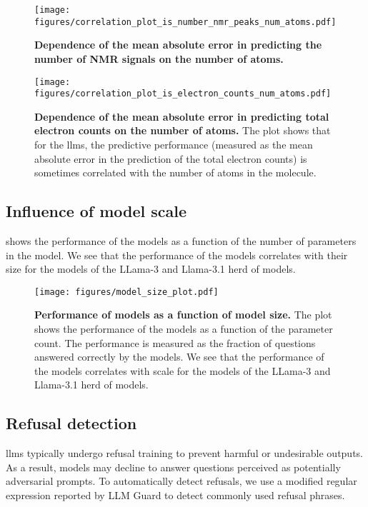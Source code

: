 \begin{figure}[!h]
    \centering
    \texttt{[image: figures/correlation\_plot\_is\_number\_nmr\_peaks\_num\_atoms.pdf]}
    \caption{\textbf{Dependence of the mean absolute error in predicting the number of NMR signals on the number of atoms.} }
    \label{fig:correlation_plot_is_number_nmr_peaks_num_atoms}
\end{figure}


\begin{figure}[!h]
    \centering
    \texttt{[image: figures/correlation\_plot\_is\_electron\_counts\_num\_atoms.pdf]}
    \caption{\textbf{Dependence of the mean absolute error in predicting total electron counts on the number of atoms.} The plot shows that for the \glspl{llm}, the predictive performance (measured as the mean absolute error in the prediction of the total electron counts) is sometimes correlated with the number of atoms in the molecule.}
    \label{fig:correlation_plot_is_electron_counts_num_atoms}
\end{figure}


\clearpage
\subsection{Influence of model scale}
 shows the performance of the models as a function of the number of parameters in the model.
We see that the performance of the models correlates with their size for the models of the LLama-3 and Llama-3.1 herd of models.

\begin{figure}[!h]
    \centering
    \texttt{[image: figures/model\_size\_plot.pdf]}
    \caption{\textbf{Performance of models as a function of model size.} The plot shows the performance of the models as a function of the parameter count. The performance is measured as the fraction of questions answered correctly by the models. We see that the performance of the models correlates with scale for the models of the LLama-3 and Llama-3.1 herd of models.}
    \label{fig:model_size_plot}
\end{figure}


\clearpage
\subsection{Refusal detection}
\Glspl{llm} typically undergo refusal training to prevent harmful or undesirable outputs. As a result, models may decline to answer questions perceived as potentially adversarial prompts.
To automatically detect refusals, we use a modified regular expression reported by LLM Guard\autocite{llmguard} to detect commonly used refusal phrases.

